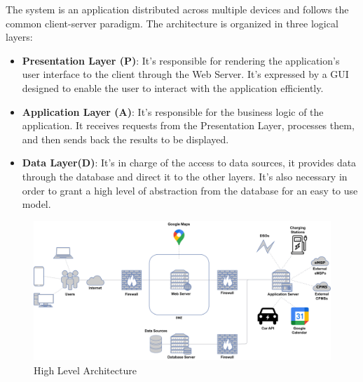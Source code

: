 \documentclass[table, 12pt]{article}
\begin{document}
The system is an application distributed across multiple devices and follows the common client-server paradigm.
The architecture is organized in three logical layers:

\begin{itemize}
    \item \textbf{Presentation Layer (P)}: It's responsible for rendering the application's user interface to the client through the Web Server. It's expressed by a GUI designed to enable the user to interact with the application efficiently.
    \item \textbf{Application Layer (A)}: It's responsible for the business logic of the application. It receives requests from the Presentation Layer, processes them, and then sends back the results to be displayed.
    \item \textbf{Data Layer(D)}: It's in charge of the access to data sources, it provides data through the database and direct it to the other layers. It's also necessary in order to grant a high level of abstraction from the database for an easy to use model.
\end{itemize}

\newpage
\begin{center}
    \begin{figure}[H]
        \includegraphics[scale=0.53, center]{assets/high_level_architecture.png}
        \caption{High Level Architecture}
        \label{fig: high_level_architecture}
    \end{figure}
\end{center}
\end{document}
